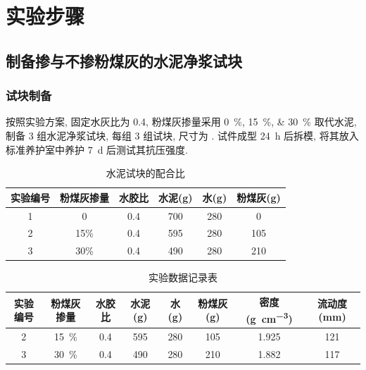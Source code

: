 
\section{实验步骤}

\subsection{制备掺与不掺粉煤灰的水泥净浆试块}

\subsubsection{试块制备}
按照实验方案, 固定水灰比为 \num{0.4}, 粉煤灰掺量采用 \qtylist{0; 15; 30}{\percent} 取代水泥, 制备 3 组水泥净浆试块, 每组 3 组试块, 尺寸为 .
试件成型 \SI{24}{\hour} 后拆模, 将其放入标准养护室中养护 \SI{7}{\day} 后测试其抗压强度.
\begin{table}[!t]
  \centering
  \caption{水泥试块的配合比}
  \begin{tabular}{|c|c|c|c|c|c|}
    \hline
    实验编号 & 粉煤灰掺量 & 水胶比 & 水泥(g) & 水(g) & 粉煤灰(g) \\ \hline
    1        & 0          & 0.4    & 700     & 280   & 0         \\ \hline
    2        & 15\%       & 0.4    & 595     & 280   & 105       \\ \hline
    3        & 30\%       & 0.4    & 490     & 280   & 210       \\ \hline
  \end{tabular}

\end{table}


\begin{table}
  \centering
  \caption{实验数据记录表}
  \begin{tabular}{cccccccc}
    \toprule
    实验编号 & 粉煤灰掺量        & 水胶比    & 水泥 (\unit{\gram}) & 水 (\unit{\gram}) & 粉煤灰 (\unit{\gram}) & 密度 (\unit{\gram\per\centi\meter\cubed}) & 流动度 (\unit{\milli\meter}) \\
    \midrule
    2        & \SI{15}{\percent} & \num{0.4} & \num{595}           & \num{280}         & \num{105}             & \num{1.925}                               & \num{121}                    \\
    3        & \SI{30}{\percent} & \num{0.4} & \num{490}           & \num{280}         & \num{210}             & \num{1.882}                               & \num{117}                    \\
    \bottomrule
  \end{tabular}
\end{table}

